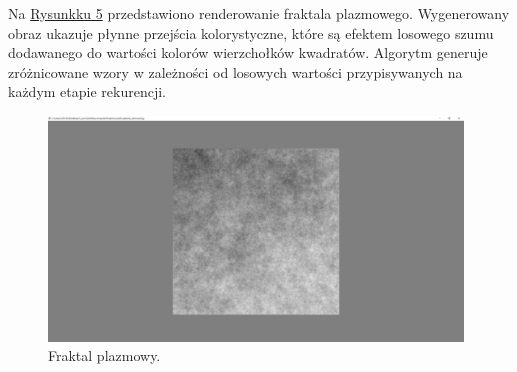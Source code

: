 \documentclass[a4paper, 12pt]{article}
\begin{document}
Na \hyperref[fig:zad5]{Rysunkku 5} przedstawiono renderowanie fraktala plazmowego. Wygenerowany obraz ukazuje płynne przejścia kolorystyczne, które są efektem losowego szumu dodawanego do wartości kolorów wierzchołków kwadratów. Algorytm generuje zróżnicowane wzory w zależności od losowych wartości przypisywanych na każdym etapie rekurencji.

\begin{figure}[h]
    \centering
    \includegraphics[width=0.98\textwidth]{zad5.png}
    \caption{Fraktal plazmowy.}
    \label{fig:zad5}
\end{figure}
\end{document}
